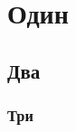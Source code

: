 \documentclass{article}
\begin{document}
\section{Один}\subsection{Два}\subsubsection{Три}
\end{document}

